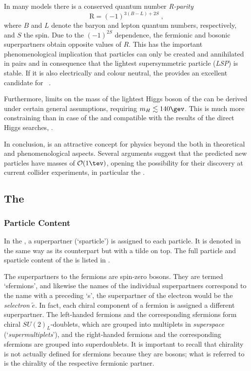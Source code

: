 In many \susy models there is a conserved quantum number \emph{R-parity}
\begin{equation*}
  \text{R} = (-1)^{3(B-L)+2S} \;,
\end{equation*}
where $B$ and $L$ denote the baryon and lepton quantum numbers, respectively, and $S$ the spin.
Due to the $(-1)^{2S}$ dependence, the fermionic and bosonic superpartners obtain opposite values  of $R$.
This has the important phenomenological implication that \susy particles can only be created and annihilated in pairs and in consequence that the lightest supersymmetric particle (\emph{LSP}) is stable.
If it is also electrically and colour neutral, the \lsp provides an excellent candidate for \dm~\cite{Bertone2005279,doi:10.1146/annurev-astro-082708-101659}.

Furthermore, limits on the mass of the lightest Higgs boson of the \mssm can be derived under certain general assumptions, requiring \mbox{$m_{H}\lesssim140\gev$}.
This is much more constraining than in case of the \sm and compatible with the results of the direct Higgs searches, \cf {}.

In conclusion, \susy is an attractive concept for physics beyond the \sm both in theoretical and phenomenological aspects.
Several arguments suggest that the predicted new particles have masses of $\mathcal{O}(1\tev)$, opening the possibility for their discovery at current collider experiments, in particular the \lhc.



\subsection{The \mssm}\label{sec:Theory:SUSY:MSSM}

\subsubsection{Particle Content}
In the \mssm, a superpartner (`sparticle') is assigned to each \sm particle.
It is denoted in the same way as its \sm counterpart but with a tilde on top.
The full particle and sparticle content of the \mssm is listed in .

The superpartners to the fermions are spin-zero bosons.
They are termed `sfermions', and likewise the names of the individual superpartners correspond to the \sm name with a preceding `s', \eg the superpartner of the electron would be the \emph{selectron} $\tilde{e}$.
In fact, each chiral component of a fermion is assigned a different superpartner.
The left-handed fermions and the corresponding sfermions form chiral $SU(2)_{L}$-doublets, which are grouped into multiplets in \emph{superspace} (`\emph{supermultiplets}'), and the right-handed fermions and the corresponding sfermions are grouped into superdoublets.
It is important to recall that chirality is not actually defined for sfermions because they are bosons; what is referred to is the chirality of the respective fermionic \sm partner.

